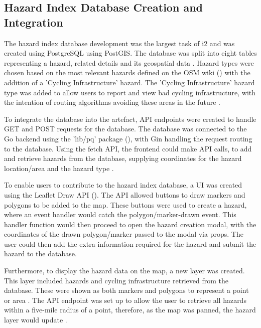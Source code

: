 \subsection{Hazard Index Database Creation and Integration}
\label{iteration2:hazard-index}

The hazard index database development was the largest task of i2 and was created using PostgreSQL using PostGIS. The database was split into eight tables representing a hazard, related details and its geospatial data . Hazard types were chosen based on the most relevant hazards defined on the OSM wiki (\cite{noauthor_keyhazard_nodate}) with the addition of a 'Cycling Infrastructure' hazard. The 'Cycling Infrastructure' hazard type was added to allow users to report and view bad cycling infrastructure, with the intention of routing algorithms avoiding these areas in the future .

To integrate the database into the artefact, API endpoints were created to handle GET and POST requests for the database. The database was connected to the Go backend using the 'lib/pq' package (\cite{noauthor_pq_nodate}), with Gin handling the request routing to the database. Using the fetch API, the frontend could make API calls, to add and retrieve hazards from the database, supplying coordinates for the hazard location/area and the hazard type .

To enable users to contribute to the hazard index database, a UI was created using the Leaflet Draw API (\cite{noauthor_leaflet_nodate-2}). The API allowed buttons to draw markers and polygons to be added to the map. These buttons were used to create a hazard, where an event handler would catch the polygon/marker-drawn event. This handler function would then proceed to open the hazard creation modal, with the coordinates of the drawn polygon/marker passed to the modal via props. The user could then add the extra information required for the hazard and submit the hazard to the database.

Furthermore, to display the hazard data on the map, a new layer was created. This layer included hazards and cycling infrastructure retrieved from the database. These were shown as both markers and polygons to represent a point or area . The API endpoint was set up to allow the user to retrieve all hazards within a five-mile radius of a point, therefore, as the map was panned, the hazard layer would update .

